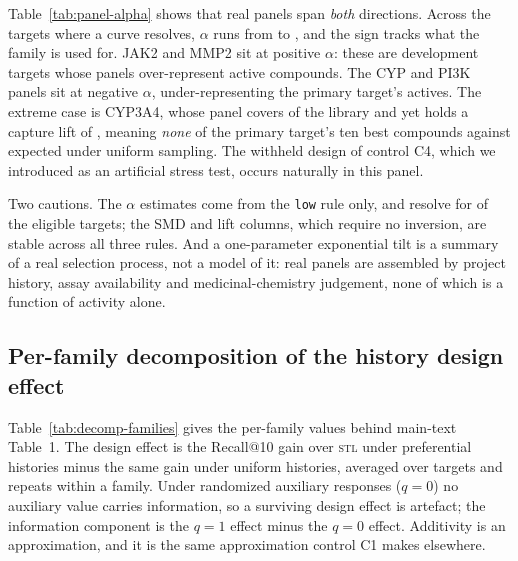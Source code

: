 \documentclass[10pt]{article}
\newcommand{\stl}{\textsc{stl}}
\newcommand{\basis}{\textsc{basis}}
\begin{document}
Table~\ref{tab:panel-alpha} shows that real panels span \emph{both}
directions. Across the \panelAlphaTargets{} targets where a curve resolves,
$\alpha$ runs from \panelAlphaMin{} to \panelAlphaMax{}, and the sign tracks
what the family is used for. JAK2 and MMP2 sit at positive $\alpha$: these are
development targets whose panels over-represent active compounds. The CYP and
PI3K panels sit at negative $\alpha$, under-representing the primary target's
actives. The extreme case is CYP3A4, whose panel covers
\panelCypThreeAFourCoverage{} of the library and yet holds a capture lift of
\panelCypThreeAFourLift{}, meaning \emph{none} of the primary target's ten
best compounds against \panelCypThreeAFourExpected{} expected under uniform
sampling. The withheld design of control C4, which we introduced as an
artificial stress test, occurs naturally in this panel.

Two cautions. The $\alpha$ estimates come from the \texttt{low} rule only, and
resolve for \panelAlphaTargets{} of the \panelReliableTargets{} eligible
targets; the SMD and lift columns, which require no inversion, are stable
across all three rules. And a one-parameter exponential tilt is a summary of a
real selection process, not a model of it: real panels are assembled by
project history, assay availability and medicinal-chemistry judgement, none of
which is a function of activity alone.

\subsection{Per-family decomposition of the history design effect}
\label{app:decomp-families}

Table~\ref{tab:decomp-families} gives the per-family values behind main-text
Table~1. The design effect is the Recall@10 gain over \stl{} under
preferential histories minus the same gain under uniform histories, averaged
over targets and repeats within a family. Under randomized auxiliary responses
($q=0$) no auxiliary value carries information, so a surviving design effect
is artefact; the information component is the $q=1$ effect minus the $q=0$
effect. Additivity is an approximation, and it is the same approximation
control C1 makes elsewhere.

\begin{table}[htbp]
\centering\small

\caption{History design effect (preferential minus uniform) in Recall@10
points, decomposed per family. The avoidance-only arm reads no auxiliary
value, so its information row is exactly zero by construction. Only \basis{}
has an artefact component whose confidence interval contains zero.}
\label{tab:decomp-families}
\end{table}
\end{document}
